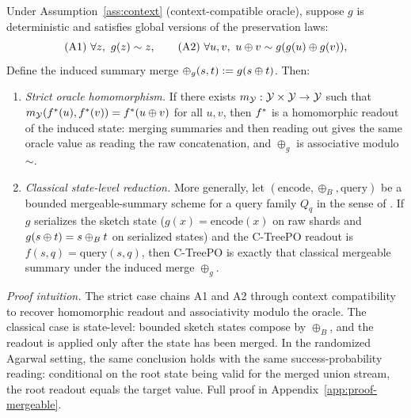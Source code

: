 \begin{proposition}\label{prop:mergeable-reduction}
Under Assumption~\ref{ass:context} (context-compatible oracle), suppose $g$ is deterministic and satisfies global versions of the preservation laws:
\[
\text{(A1)}\ \forall z,\ g(z) \sim z,\qquad
\text{(A2)}\ \forall u,v,\ u \oplus v \sim g(g(u)\oplus g(v)),
\]
Define the induced summary merge $\oplus_g(s,t):=g(s\oplus t)$. Then:
\begin{enumerate}[nosep]
\item \emph{Strict oracle homomorphism.} If there exists
$m_{\mathcal{Y}}:\mathcal{Y}\times\mathcal{Y}\to\mathcal{Y}$ such that
$m_{\mathcal{Y}}(f^\ast(u),f^\ast(v))=f^\ast(u\oplus v)$ for all $u,v$, then
$f^\ast$ is a homomorphic readout of the induced state: merging summaries and
then reading out gives the same oracle value as reading the raw concatenation,
and $\oplus_g$ is associative modulo $\sim$.
\item \emph{Classical state-level reduction.} More generally, let
$(\mathrm{encode},\oplus_B,\mathrm{query})$ be a bounded mergeable-summary
scheme for a query family $Q_q$ in the sense of
\citet{Agarwal2013MergeableTODS}. If $g$ serializes the sketch state
($g(x)=\mathrm{encode}(x)$ on raw shards and
$g(s\oplus t)=s\oplus_B t$ on serialized states) and the C-TreePO readout is
$f(s,q)=\mathrm{query}(s,q)$, then C-TreePO is exactly that classical
mergeable summary under the induced merge $\oplus_g$.
\end{enumerate}
\end{proposition}

\noindent\textit{Proof intuition.} The strict case chains A1 and A2 through
context compatibility to recover homomorphic readout and associativity modulo
the oracle. The classical case is state-level: bounded sketch states compose
by $\oplus_B$, and the readout is applied only after the state has been
merged. In the randomized Agarwal setting, the same conclusion holds with the
same success-probability reading: conditional on the root state being valid for the
merged union stream, the root readout equals the target value. Full proof in
Appendix~\ref{app:proof-mergeable}.


